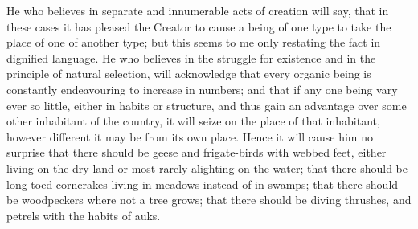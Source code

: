 He who believes in separate and innumerable acts of creation will say, that in these cases it has pleased the Creator to cause a being of one type to take the place of one of another type; but this seems to me only restating the fact in dignified language. He who believes in the struggle for existence and in the principle of natural selection, will acknowledge that every organic being is constantly endeavouring to increase in numbers; and that if any one being vary ever so little, either in habits or structure, and thus gain an advantage over some other inhabitant of the country, it will seize on the place of that inhabitant, however different it may be from its own place. Hence it will cause him no surprise that there should be geese and frigate-birds with webbed feet, either living on the dry land or most rarely alighting on the water; that there should be long-toed corncrakes living in meadows instead of in swamps; that there should be woodpeckers where not a tree grows; that there should be diving thrushes, and petrels with the habits of auks.

